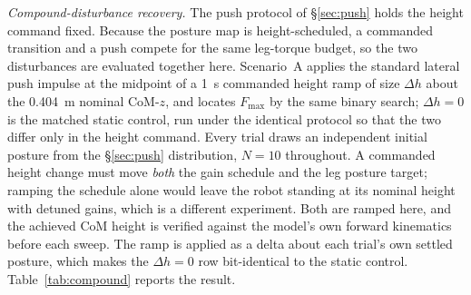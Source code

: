 \documentclass[conference]{IEEEtran}
\begin{document}
\emph{Compound-disturbance recovery.}
The push protocol of \S\ref{sec:push} holds the height command fixed. Because
the posture map is height-scheduled, a commanded transition and a push compete
for the same leg-torque budget, so the two disturbances are evaluated together
here. Scenario~A applies the standard lateral push impulse at the midpoint of a
\SI{1}{s} commanded height ramp of size $\Delta h$ about the \SI{0.404}{m}
nominal CoM-$z$, and locates $F_{\max}$ by the same binary search; $\Delta h{=}0$
is the matched static control, run under the identical protocol so that the two
differ only in the height command. Every trial draws an independent initial
posture from the \S\ref{sec:push} distribution, $N{=}10$ throughout.
A commanded height change must move \emph{both} the gain schedule and the leg
posture target; ramping the schedule alone would leave the robot standing at its
nominal height with detuned gains, which is a different experiment. Both are
ramped here, and the achieved CoM height is verified against the model's own
forward kinematics before each sweep. The ramp is applied as a delta about each
trial's own settled posture, which makes the $\Delta h{=}0$ row bit-identical to
the static control.
Table~\ref{tab:compound} reports the result.
\end{document}
